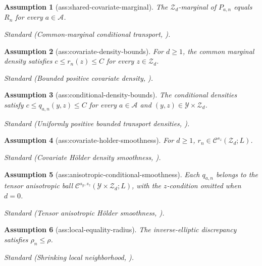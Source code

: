 \documentclass{article}
\newtheorem{assumption}{Assumption}
\begin{document}
\begin{assumption}[ass:shared-covariate-marginal]\label{ass:shared-covariate-marginal}
The \(\mathcal Z_d\)-marginal of \(P_{a,n}\) equals \(R_n\) for every \(a\in\mathcal A\).
\par\smallskip\noindent\emph{Standard} (Common-marginal conditional transport, \cite{LinGaoBlanchetGlynn2026SmoothCOT}).
\end{assumption}

\begin{assumption}[ass:covariate-density-bounds]\label{ass:covariate-density-bounds}
For \(d\ge1\), the common marginal density satisfies \(c\le r_n(z)\le C\) for every \(z\in\mathcal Z_d\).
\par\smallskip\noindent\emph{Standard} (Bounded positive covariate density, \cite{LinGaoBlanchetGlynn2026SmoothCOT}).
\end{assumption}

\begin{assumption}[ass:conditional-density-bounds]\label{ass:conditional-density-bounds}
The conditional densities satisfy \(c\le q_{a,n}(y,z)\le C\) for every \(a\in\mathcal A\) and \((y,z)\in\mathcal Y\times\mathcal Z_d\).
\par\smallskip\noindent\emph{Standard} (Uniformly positive bounded transport densities, \cite{LinGaoBlanchetGlynn2026SmoothCOT}).
\end{assumption}

\begin{assumption}[ass:covariate-holder-smoothness]\label{ass:covariate-holder-smoothness}
For \(d\ge1\), \(r_n\in\mathcal C^{s_z}(\mathcal Z_d;L)\).
\par\smallskip\noindent\emph{Standard} (Covariate H\"older density smoothness, \cite{NilesWeedBerthet2022}).
\end{assumption}

\begin{assumption}[ass:anisotropic-conditional-smoothness]\label{ass:anisotropic-conditional-smoothness}
Each \(q_{a,n}\) belongs to the tensor anisotropic ball \(\mathcal C^{s_y,s_z}(\mathcal Y\times\mathcal Z_d;L)\), with the \(z\)-condition omitted when \(d=0\).
\par\smallskip\noindent\emph{Standard} (Tensor anisotropic H\"older smoothness, \cite{CohenDaubechiesVial1993}).
\end{assumption}

\begin{assumption}[ass:local-equality-radius]\label{ass:local-equality-radius}
The inverse-elliptic discrepancy satisfies \(\rho_n\le\rho\).
\par\smallskip\noindent\emph{Standard} (Shrinking local neighborhood, \cite{ChenFang2019}).
\end{assumption}
\end{document}
